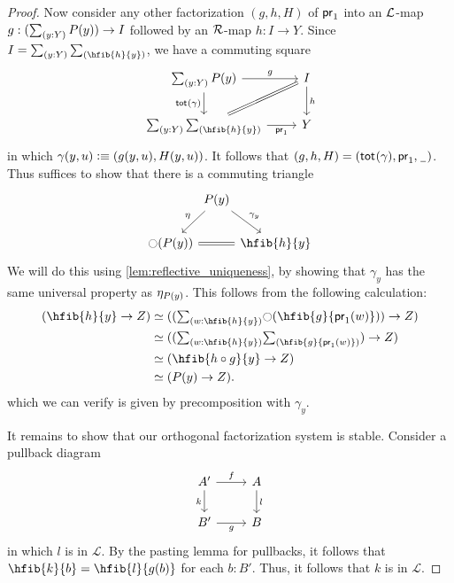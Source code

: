\begin{proof}
Now consider any other factorization $(g,h,H)$ of $\proj1$ into
an $\cL$-map $g:(\sm{y:Y}P(y))\to I$ followed by an $\cR$-map $h:I\to Y$. Since
$I=\sm{y:Y}\hfib{h}{y}$, we have a commuting square
\begin{equation*}
\begin{tikzcd}
\sm{y:Y}P(y) \arrow[r,"g"] \arrow[d,swap,"{\total{\gamma}}"]
  & I \arrow[d,"h"] \\
\sm{y:Y}\hfib{h}{y} \arrow[ur,equals] \arrow[r,swap,"\proj1"] & Y
\end{tikzcd}
\end{equation*}
in which $\gamma(y,u)\defeq \pairr{g(y,u),H(y,u)}$.
It follows that $(g,h,H)=(\total{\gamma},\proj1,\nameless)$.
Thus suffices to show that there is a commuting triangle
\begin{equation*}
\begin{tikzcd}[column sep=0]
& P(y) \arrow[dl,swap,"\modalunit"] \arrow[dr,"{\gamma_y}"] \\
\modal(P(y)) \arrow[rr,equals] & & \hfib{h}{y}
\end{tikzcd}
\end{equation*}
We will do this using \cref{lem:reflective_uniqueness}, by showing that $\gamma_y$ has the same universal property as $\modalunit[P(y)]$.
This follows from the following calculation:
\begin{align*}
(\hfib{h}{y}\to Z) & \eqvsym ((\sm{w:\hfib{h}{y}}\modal(\hfib{g}{\proj1(w)}))\to Z) \\
& \eqvsym ((\sm{w:\hfib{h}{y}}\hfib{g}{\proj1(w)})\to Z) \\
& \eqvsym (\hfib{h\circ g}{y}\to Z) \\
& \eqvsym (P(y)\to Z).
\end{align*}
which we can verify is given by precomposition with $\gamma_y$.

It remains to show that our orthogonal factorization system is stable. Consider a pullback diagram
\begin{equation*}
\begin{tikzcd}
A' \arrow[d,swap,"k"] \arrow[r,"f"] & A \arrow[d,"l"] \\
B' \arrow[r,swap,"g"] & B
\end{tikzcd}
\end{equation*}
in which $l$ is in $\mathcal{L}$. By the pasting lemma for pullbacks, it
follows that $\hfib{k}{b}=\hfib{l}{g(b)}$ for each $b:B'$. Thus, it follows that
$k$ is in $\mathcal{L}$.
\end{proof}


